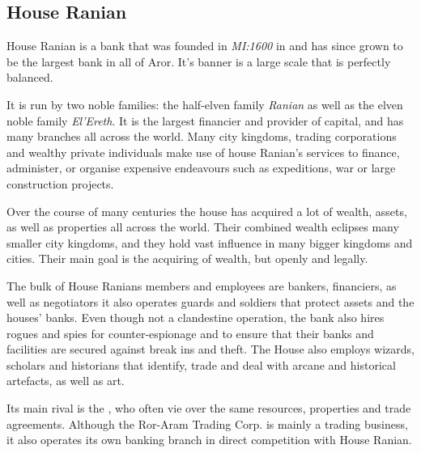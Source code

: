 \subsection{House Ranian}
\label{sec:House Ranian}

House Ranian is a bank that was founded in \emph{MI:1600} in
 and has since grown to be the largest bank in all of
Aror. It's banner is a large scale that is perfectly balanced.

It is run by two noble families: the half-elven family \emph{Ranian} as well
as the elven noble family \emph{El'Ereth}. It is the largest financier and
provider of capital, and has many branches all across the world. Many city
kingdoms, trading corporations and wealthy private individuals make use of
house Ranian's services to finance, administer, or organise expensive
endeavours such as expeditions, war or large construction projects.

Over the course of many centuries the house has acquired a lot of wealth,
assets, as well as properties all across the world. Their combined wealth
eclipses many smaller city kingdoms, and they hold vast influence in many
bigger kingdoms and cities. Their main goal is the acquiring of wealth,
but openly and legally.

The bulk of House Ranians members and employees are bankers, financiers,
as well as negotiators it also operates guards and soldiers that protect
assets and the houses' banks. Even though not a clandestine operation,
the bank also hires rogues and spies for counter-espionage and to ensure
that their banks and facilities are secured against break ins and theft.
The House also employs wizards, scholars and historians that identify,
trade and deal with arcane and historical artefacts, as well as art.

Its main rival is the , who often
vie over the same resources, properties and trade agreements. Although the
Ror-Aram Trading Corp. is mainly a trading business, it also operates its
own banking branch in direct competition with House Ranian.
